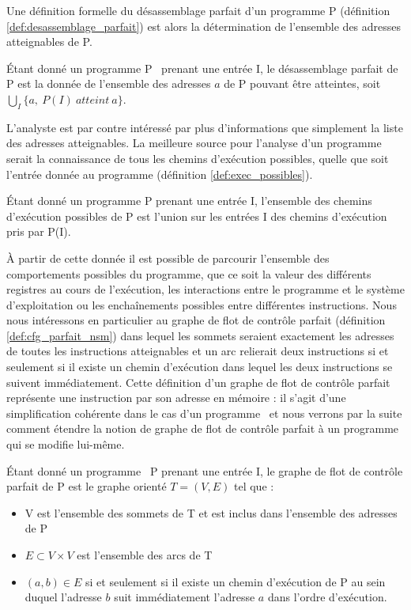Une définition formelle du désassemblage parfait d'un programme P (définition \ref{def:desassemblage_parfait}) est alors la détermination de l'ensemble des adresses atteignables de P.

\begin{defi}
 Étant donné un programme P \nsm\ prenant une entrée I, le désassemblage parfait de P est la donnée de l'ensemble des adresses $a$ de P pouvant être atteintes, soit $\bigcup_{I} \{a,\ P(I)\ atteint\ a\}$.
\label{def:desassemblage_parfait}
\end{defi}

L'analyste est par contre intéressé par plus d'informations que simplement la liste des adresses atteignables. 
La meilleure source pour l'analyse d'un programme serait la connaissance de tous les chemins d'exécution possibles, quelle que soit l'entrée donnée au programme (définition \ref{def:exec_possibles}).

\begin{defi}
 Étant donné un programme P prenant une entrée I, l'ensemble des chemins d'exécution possibles de P est l'union sur les entrées I des chemins d'exécution pris par P(I).
\label{def:exec_possibles}
\end{defi}

À partir de cette donnée il est possible de parcourir l'ensemble des comportements possibles du programme, que ce soit la valeur des différents registres au cours de l'exécution, les interactions entre le programme et le système d'exploitation ou les enchaînements possibles entre différentes instructions.
Nous nous intéressons en particulier au graphe de flot de contrôle parfait (définition \ref{def:cfg_parfait_nsm}) dans lequel les sommets seraient exactement les adresses de toutes les instructions atteignables et un arc relierait deux instructions si et seulement si il existe un chemin d'exécution dans lequel les deux instructions se suivent immédiatement.
Cette définition d'un graphe de flot de contrôle parfait représente une instruction par son adresse en mémoire : il s'agit d'une simplification cohérente dans le cas d'un programme \nsm\ et nous verrons par la suite comment étendre la notion de graphe de flot de contrôle parfait à un programme qui se modifie lui-même.

\begin{defi}
 Étant donné un programme \nsm\ P prenant une entrée I, le graphe de flot de contrôle parfait de P est le graphe orienté $T=(V, E)$ tel que :
 \begin{itemize}
  \item V est l'ensemble des sommets de T et est inclus dans l'ensemble des adresses de P
  \item $E\subset V\times V$ est l'ensemble des arcs de T
  \item $(a, b)\in E$ si et seulement si il existe un chemin d'exécution de P au sein duquel l'adresse $b$ suit immédiatement l'adresse $a$ dans l'ordre d'exécution.
 \end{itemize}
\label{def:cfg_parfait_nsm}
\end{defi}

